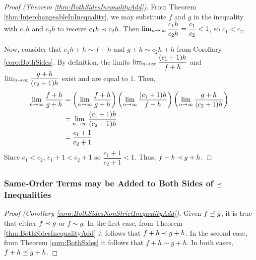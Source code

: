 \begin{proof}[Proof (Theorem \ref{thm:BothSidesInequalityAdd})]
	From Theorem \ref{thm:InterchangeableInInequality}, we may substitute $f$ and $g$ in the inequality with $c_1 h$ and $c_2 h$ to receive $c_1 h \prec c_2 h$. Then $\lim_{n \to \infty} \dfrac{c_1 h}{c_2 h} = \dfrac{c_1}{c_2} < 1$, so $c_1 < c_2$.
	
	Now, consider that $c_1 h + h \sim f + h$ and $g + h \sim c_2 h + h$ from Corollary \ref{coro:BothSides}. By definition, the limits $\lim_{n \to \infty} \dfrac{(c_1 + 1) h}{f + h}$ and $\lim_{n \to \infty} \dfrac{g + h}{(c_2 + 1) h}$ exist and are equal to $1$. Then,
	\begin{align*}
	\lim_{n \to \infty} \frac{f + h}{g + h} &= \left( \lim_{n \to \infty} \frac{f + h}{g + h} \right) \left( \lim_{n \to \infty} \dfrac{(c_1 + 1) h}{f + h} \right) \left( \lim_{n \to \infty} \dfrac{g + h}{(c_2 + 1) h} \right)\\
	&= \lim_{n \to \infty} \frac{(c_1 + 1) h}{(c_2 + 1) h}\\
	&= \frac{c_1 + 1}{c_2 + 1}
	\end{align*}
	Since $c_1 < c_2$, $c_1 + 1 < c_2 + 1$ so $\dfrac{c_1 + 1}{c_2 + 1} < 1$. Thus, $f + h \prec g + h$.
\end{proof}

\subsubsection{Same-Order Terms may be Added to Both Sides of $\preceq$ Inequalities}

\begin{proof}[Proof (Corollary \ref{coro:BothSidesNonStrictInequalityAdd})]
	Given $f \preceq g$, it is true that either $f \prec g$ or $f \sim g$. In the first case, from Theorem \ref{thm:BothSidesInequalityAdd} it follows that $f + h \prec g + h$. In the second case, from Theorem \ref{coro:BothSides} it follows that $f + h \sim g + h$. In both cases, $f + h \preceq g + h$.
\end{proof}